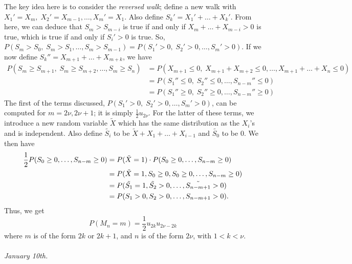 \documentclass[15pt,a4paper]{book}
\theoremstyle{definition}
\newcommand{\eax}[1]{\emph{#1}\index{#1}} %
\begin{document}
The key idea here is to consider the \eax{reversed walk}; define a new walk with $X_{1}'=X_{m},\; X_{2}'=X_{m-1},\ldots,X_{m}'=X_{1}$. Also define $S_{k}' = X_{1}' + \ldots + X_{k}'$. From here, we can deduce that $S_{m}>S_{m-i}$ is true if and only if $X_{m}+\ldots+X_{m-i}>0$ is true, which is true if and only if $S_{i}'>0$ is true. So, $P(S_{m}>S_{0},\; S_{m}>S_{1},\ldots,S_{m}>S_{m-1}) = P(S_{1}'>0,\; S_{2}'>0, \ldots, S_{m}'>0)$. If we now define $S_{k}''=X_{m+1}+\ldots+X_{m+k}$, we have
\begin{align*}
    P(S_{m} \geq S_{m+1},\; S_{m} \geq S_{m+2}, \ldots, S_{m} \geq S_{n}) &= P(X_{m+1}\leq 0,\; X_{m+1}+X_{m+2}\leq 0, \ldots, X_{m+1}+\ldots+X_{n}\leq 0) \\
    &= P(S_{1}''\leq 0,\; S_{2}''\leq 0,\ldots,S_{n-m}''\leq 0) \\
    &= P(S_{1}''\geq 0,\; S_{2}''\geq 0,\ldots,S_{n-m}''\geq 0)
\end{align*}
The first of the terms discussed, $P(S_{1}'>0,\; S_{2}'>0, \ldots, S_{m}'>0)$, can be computed for $m = 2\nu, 2\nu+1$; it is simply $\frac{1}{2}u_{2\nu}$. For the latter of these terms, we introduce a new random variable $\tilde{X}$ which has the same distribution as the $X_{i}$'s and is independent. Also define $\tilde{S_{i}}$ to be $\tilde{X}+X_{1}+\ldots+X_{i-1}$ and $\tilde{S_{0}}$ to be $0$. We then have
\begin{align}
    \frac{1}{2}P(S_{0} \geq 0, \ldots, S_{n-m} \geq 0) &= P(\tilde{X}=1) \cdot P(S_{0} \geq 0, \ldots, S_{n-m} \geq 0) \notag\\
    &= P(\tilde{X}=1,S_{0} \geq 0, S_{0} \geq 0, \ldots, S_{n-m} \geq 0) \notag\\
    &= P(\tilde{S_{1}}=1,\tilde{S_{2}}>0,\ldots,\tilde{S_{n-m+1}}>0) \notag\\
    &= P(S_{1}>0,S_{2}>0,\ldots,S_{n-m+1}>0).
\end{align}
Thus, we get
\begin{equation}
    P(M_{n}=m) = \frac{1}{2} u_{2k}u_{2\nu-2k}
\end{equation}
where $m$ is of the form $2k$ or $2k+1$, and $n$ is of the form $2\nu$, with $1 < k < \nu$.\\ \\
\textit{January 10th.}
\end{document}
